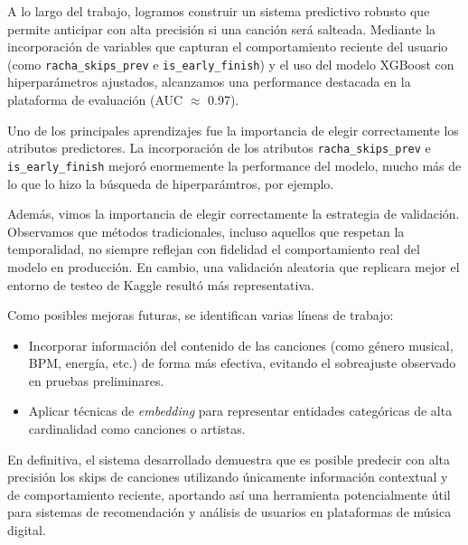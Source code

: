 \documentclass{article}
\begin{document}
A lo largo del trabajo, logramos construir un sistema predictivo robusto que permite anticipar con alta precisión si una canción será salteada. Mediante la incorporación de variables que capturan el comportamiento reciente del usuario (como \texttt{racha\_skips\_prev} e \texttt{is\_early\_finish}) y el uso del modelo XGBoost con hiperparámetros ajustados, alcanzamos una performance destacada en la plataforma de evaluación (AUC $\approx$ 0.97).

Uno de los principales aprendizajes fue la importancia de elegir correctamente los atributos predictores. La incorporación de los atributos \texttt{racha\_skips\_prev} e \texttt{is\_early\_finish} mejoró enormemente la performance del modelo, mucho más de lo que lo hizo la búsqueda de hiperparámtros, por ejemplo.

Además, vimos la importancia de elegir correctamente la estrategia de validación. Observamos que métodos tradicionales, incluso aquellos que respetan la temporalidad, no siempre reflejan con fidelidad el comportamiento real del modelo en producción. En cambio, una validación aleatoria que replicara mejor el entorno de testeo de Kaggle resultó más representativa.

Como posibles mejoras futuras, se identifican varias líneas de trabajo:
\begin{itemize}
    \item Incorporar información del contenido de las canciones (como género musical, BPM, energía, etc.) de forma más efectiva, evitando el sobreajuste observado en pruebas preliminares.
    \item Aplicar técnicas de \textit{embedding} para representar entidades categóricas de alta cardinalidad como canciones o artistas.
\end{itemize}

En definitiva, el sistema desarrollado demuestra que es posible predecir con alta precisión los skips de canciones utilizando únicamente información contextual y de comportamiento reciente, aportando así una herramienta potencialmente útil para sistemas de recomendación y análisis de usuarios en plataformas de música digital.
\end{document}

